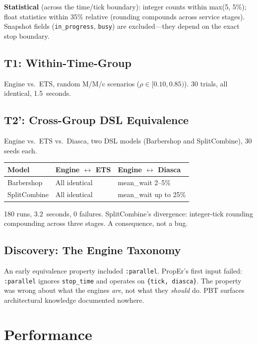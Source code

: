 \documentclass[sigplan,review,anonymous=false]{acmart}
\begin{document}
\textbf{Statistical} (across the time/tick boundary): integer counts
within max(5, 5\%); float statistics within 35\% relative (rounding
compounds across service stages). Snapshot fields (\texttt{in\_progress},
\texttt{busy}) are excluded---they depend on the exact stop boundary.

\subsection{T1: Within-Time-Group}

Engine vs.\ ETS, random M/M/c scenarios ($\rho \in [0.10, 0.85)$). 30
trials, all identical, 1.5~seconds.

\subsection{T2': Cross-Group DSL Equivalence}

Engine vs.\ ETS vs.\ Diasca, two DSL models (Barbershop and
SplitCombine), 30 seeds each.

\begin{table}[h]
\small
\begin{tabular}{lll}
\toprule
Model & Engine $\leftrightarrow$ ETS & Engine $\leftrightarrow$ Diasca \\
\midrule
Barbershop & All identical & mean\_wait 2--5\% \\
SplitCombine & All identical & mean\_wait up to 25\% \\
\bottomrule
\end{tabular}
\end{table}

180 runs, 3.2~seconds, 0 failures. SplitCombine's divergence:
integer-tick rounding compounding across three stages. A consequence,
not a bug.

\subsection{Discovery: The Engine Taxonomy}

An early equivalence property included \texttt{:parallel}. PropEr's
first input failed: \texttt{:parallel} ignores \texttt{stop\_time} and
operates on \texttt{\{tick, diasca\}}. The property was wrong about what
the engines \emph{are}, not what they \emph{should} do. PBT surfaces
architectural knowledge documented nowhere.


\section{Performance}
\end{document}
